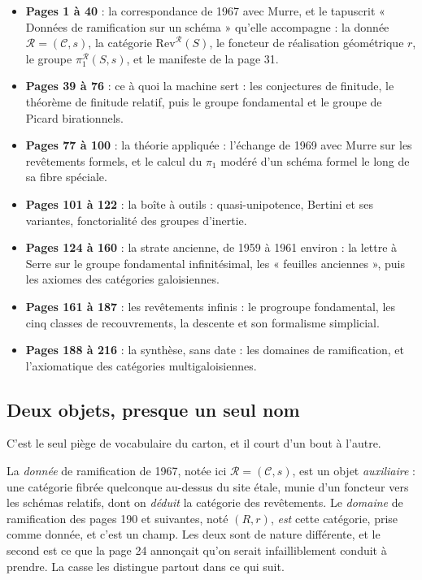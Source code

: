 \documentclass[11pt,a4paper]{article}
\begin{document}
\begin{itemize}
  \item \textbf{Pages 1 à 40} : la correspondance de 1967 avec Murre, et le
    tapuscrit « Données de ramification sur un schéma » qu'elle accompagne :
    la donnée $\mathcal{R} = (\mathcal{C}, s)$, la catégorie
    $\mathrm{Rev}^{\mathcal{R}}(S)$, le foncteur de réalisation géométrique
    $r$, le groupe $\pi_1^{\mathcal{R}}(S,s)$, et le manifeste de la page 31.
  \item \textbf{Pages 39 à 76} : ce à quoi la machine sert : les conjectures
    de finitude, le théorème de finitude relatif, puis le groupe fondamental et
    le groupe de Picard birationnels.
  \item \textbf{Pages 77 à 100} : la théorie appliquée : l'échange de 1969
    avec Murre sur les revêtements formels, et le calcul du $\pi_1$ modéré d'un
    schéma formel le long de sa fibre spéciale.
  \item \textbf{Pages 101 à 122} : la boîte à outils : quasi-unipotence,
    Bertini et ses variantes, fonctorialité des groupes d'inertie.
  \item \textbf{Pages 124 à 160} : la strate ancienne, de 1959 à 1961 environ : la
    lettre à Serre sur le groupe fondamental infinitésimal, les « feuilles
    anciennes », puis les axiomes des catégories galoisiennes.
  \item \textbf{Pages 161 à 187} : les revêtements infinis : le progroupe
    fondamental, les cinq classes de recouvrements, la descente et son
    formalisme simplicial.
  \item \textbf{Pages 188 à 216} : la synthèse, sans date : les domaines de
    ramification, et l'axiomatique des catégories multigaloisiennes.
\end{itemize}

\subsection*{Deux objets, presque un seul nom}

C'est le seul piège de vocabulaire du carton, et il court d'un bout à l'autre.

La \emph{donnée} de ramification de 1967, notée ici
$\mathcal{R} = (\mathcal{C}, s)$, est un objet \emph{auxiliaire} : une
catégorie fibrée quelconque au-dessus du site étale, munie d'un foncteur vers
les schémas relatifs, dont on \emph{déduit} la catégorie des revêtements. Le
\emph{domaine} de ramification des pages 190 et suivantes, noté $(R, r)$,
\emph{est} cette catégorie, prise comme donnée, et c'est un champ. Les deux
sont de nature différente, et le second est ce que la page 24 annonçait qu'on
serait infailliblement conduit à prendre. La casse les distingue partout dans
ce qui suit.
\end{document}
